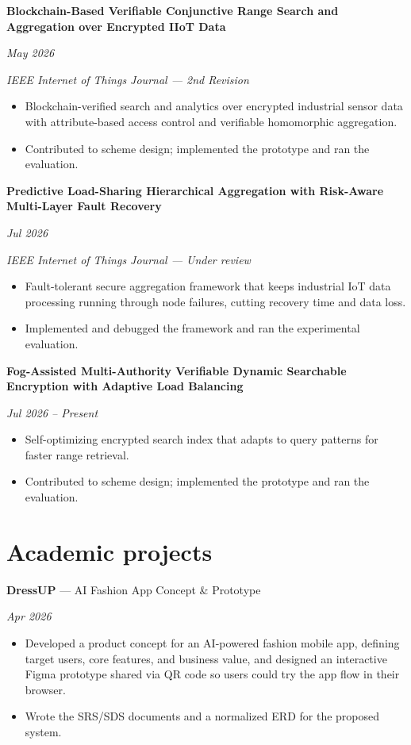 \documentclass[11pt,a4paper]{article}
\newcommand{\entry}[2]{%
  \begin{minipage}[t]{0.85\textwidth}\raggedright #1\end{minipage}%
  \hfill%
  \begin{minipage}[t]{0.15\textwidth}\raggedleft\textit{#2}\end{minipage}%
  \par\vspace{1pt}%
}
\newenvironment{details}
{\begin{itemize}[leftmargin=0.5em,topsep=2pt,itemsep=0pt,parsep=0pt]}
{\end{itemize}\vspace{-3pt}}
\newcommand{\venue}[1]{\textit{#1}\par}
\begin{document}
\entry{\textbf{Blockchain-Based Verifiable Conjunctive Range Search and Aggregation over
Encrypted IIoT Data}}{May 2026}
\venue{IEEE Internet of Things Journal --- 2nd Revision}
\begin{details}
  \item Blockchain-verified search and analytics over encrypted industrial sensor data
        with attribute-based access control and verifiable homomorphic aggregation.
  \item Contributed to scheme design; implemented the prototype and ran the evaluation.
\end{details}

\entry{\textbf{Predictive Load-Sharing Hierarchical Aggregation with Risk-Aware
       Multi-Layer Fault Recovery}}{Jul 2026}
\venue{IEEE Internet of Things Journal --- Under review}
\begin{details}
  \item Fault-tolerant secure aggregation framework that keeps industrial IoT data
        processing running through node failures, cutting recovery time and data loss.
  \item Implemented and debugged the framework and ran the experimental evaluation.
\end{details}

\entry{\textbf{Fog-Assisted Multi-Authority Verifiable Dynamic Searchable Encryption
       with Adaptive Load Balancing}}{Jul 2026 -- Present}
\begin{details}
  \item Self-optimizing encrypted search index that adapts to query patterns for faster
        range retrieval.
  \item Contributed to scheme design; implemented the prototype and ran the evaluation.
\end{details}

\section{Academic projects}

\entry{\textbf{DressUP} --- AI Fashion App Concept \& Prototype}{Apr 2026}
\begin{details}
  \item Developed a product concept for an AI-powered fashion mobile app, defining target
        users, core features, and business value, and designed an interactive Figma
        prototype shared via QR code so users could try the app flow in their browser.
  \item Wrote the SRS/SDS documents and a normalized ERD for the proposed system.
\end{details}
\end{document}
